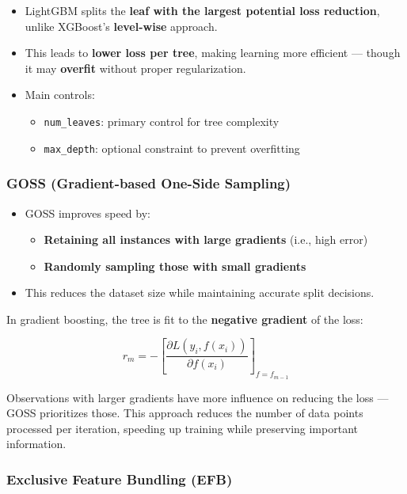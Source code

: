 \documentclass[
  letterpaper,
  DIV=11,
  numbers=noendperiod]{scrreprt}
\providecommand{\tightlist}{%
  \setlength{\itemsep}{0pt}\setlength{\parskip}{0pt}}\usepackage{longtable,booktabs,array}
\begin{document}
\begin{itemize}
\tightlist
\item
  LightGBM splits the \textbf{leaf with the largest potential loss
  reduction}, unlike XGBoost's \textbf{level-wise} approach.
\item
  This leads to \textbf{lower loss per tree}, making learning more
  efficient --- though it may \textbf{overfit} without proper
  regularization.
\item
  Main controls:

  \begin{itemize}
  \tightlist
  \item
    \texttt{num\_leaves}: primary control for tree complexity
  \item
    \texttt{max\_depth}: optional constraint to prevent overfitting
  \end{itemize}
\end{itemize}

\subsubsection{GOSS (Gradient-based One-Side
Sampling)}\label{goss-gradient-based-one-side-sampling}

\begin{itemize}
\tightlist
\item
  GOSS improves speed by:

  \begin{itemize}
  \tightlist
  \item
    \textbf{Retaining all instances with large gradients} (i.e., high
    error)
  \item
    \textbf{Randomly sampling those with small gradients}
  \end{itemize}
\item
  This reduces the dataset size while maintaining accurate split
  decisions.
\end{itemize}

In gradient boosting, the tree is fit to the \textbf{negative gradient}
of the loss:

\[
r_m = -\left[ \frac{\partial L(y_i, f(x_i))}{\partial f(x_i)} \right]_{f = f_{m-1}}
\]

Observations with larger gradients have more influence on reducing the
loss --- GOSS prioritizes those. This approach reduces the number of
data points processed per iteration, speeding up training while
preserving important information.

\subsubsection{Exclusive Feature Bundling
(EFB)}\label{exclusive-feature-bundling-efb}
\end{document}
